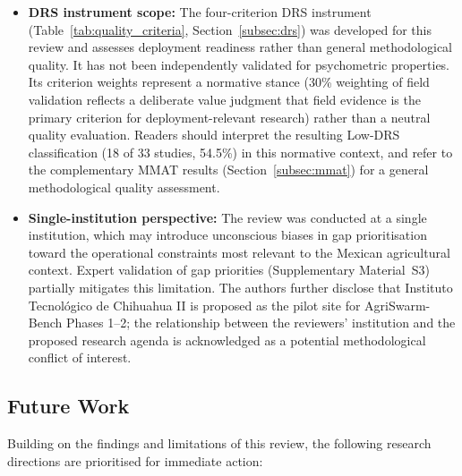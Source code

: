 \documentclass[review,3p,times]{elsarticle}
\begin{document}
\begin{itemize}
  \item \textbf{DRS instrument scope:} The four-criterion DRS instrument (Table~\ref{tab:quality_criteria}, Section~\ref{subsec:drs}) was developed for this review and assesses deployment readiness rather than general methodological quality. It has not been independently validated for psychometric properties. Its criterion weights represent a normative stance (30\% weighting of field validation reflects a deliberate value judgment that field evidence is the primary criterion for deployment-relevant research) rather than a neutral quality evaluation. Readers should interpret the resulting Low-DRS classification (18 of 33 studies, 54.5\%) in this normative context, and refer to the complementary MMAT results (Section~\ref{subsec:mmat}) for a general methodological quality assessment.
  \item \textbf{Single-institution perspective:} The review was conducted at a single institution, which may introduce unconscious biases in gap prioritisation toward the operational constraints most relevant to the Mexican agricultural context. Expert validation of gap priorities (Supplementary Material~S3) partially mitigates this limitation. The authors further disclose that Instituto Tecnológico de Chihuahua II is proposed as the pilot site for AgriSwarm-Bench Phases 1--2; the relationship between the reviewers' institution and the proposed research agenda is acknowledged as a potential methodological conflict of interest.
\end{itemize}

\subsection{Future Work}

Building on the findings and limitations of this review, the following research directions are prioritised for immediate action:
\end{document}
